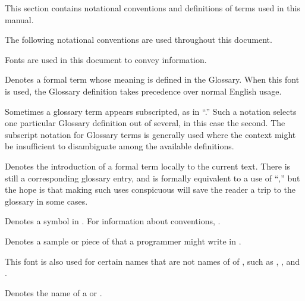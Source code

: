 
This section contains notational conventions and definitions of terms
used in this manual.


The following notational conventions are used throughout this document.


Fonts are used in this document to convey information.

\beginlist


Denotes a formal term whose meaning is defined in the Glossary.
When this font is used, the Glossary definition takes precedence 
over normal English usage.

Sometimes a glossary term appears subscripted, 
as in ``.''  
Such a notation selects one particular Glossary definition out of several,
in this case the second.
The subscript notation for Glossary terms is generally used where the
context might be insufficient to disambiguate among the available definitions.


Denotes the introduction of a formal term locally to the current text.
There is still a corresponding glossary entry, and is formally equivalent
to a use of ``,'' but the hope is that making such uses 
conspicuous will save the reader a trip to the glossary in some cases.

                           
Denotes a symbol in .
For information about  conventions,
\seesection\CaseInSymbols.


Denotes a sample  or piece of  that a programmer
might write in \clisp.

This font is also used for certain  names that are not
names of  of , 
such as ,
         ,
    and .


Denotes the name of a  or .

